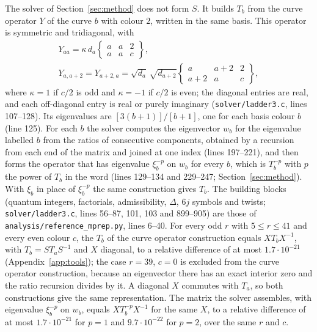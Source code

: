 \documentclass[11pt]{amsart}
\theoremstyle{definition}
\theoremstyle{remark}
\begin{document}
The solver of Section~\ref{sec:method} does not form $S$. It builds $T_b$ from the
curve operator $Y$ of the curve $b$ with colour $2$, written in the same basis. This
operator is symmetric and tridiagonal, with
\begin{gather*}
Y_{aa} = \kappa\, d_a \begin{Bmatrix} a & a & 2 \\ a & a & c \end{Bmatrix},
\\
Y_{a,a+2} = Y_{a+2,a} = \sqrt{d_a}\,\sqrt{d_{a+2}}
\begin{Bmatrix} a & a+2 & 2 \\ a+2 & a & c \end{Bmatrix},
\end{gather*}
where $\kappa = 1$ if $c/2$ is odd and $\kappa = -1$ if $c/2$ is even; the diagonal
entries are real, and each off-diagonal entry is real or purely imaginary
(\texttt{solver/ladder3.c}, lines 107--128). Its eigenvalues are $[3(b+1)]/[b+1]$,
one for each basis colour $b$ (line 125). For each $b$ the solver computes the
eigenvector $w_b$ for the eigenvalue labelled $b$ from the ratios of consecutive
components, obtained by a recursion from each end of the matrix and joined at one
index (lines 197--221), and then forms the operator that has eigenvalue $\xi_b^{-p}$
on $w_b$ for every $b$, which is $T_b^{-p}$ with $p$ the power of $T_b$ in the word
(lines 129--134 and 229--247; Section~\ref{sec:method}). With $\xi_b$ in place of
$\xi_b^{-p}$ the same construction gives $T_b$. The building blocks (quantum integers,
factorials, admissibility, $\Delta$, $6j$ symbols and twists;
\texttt{solver/ladder3.c}, lines 56--87, 101, 103 and 899--905) are those of
\texttt{analysis/reference\_mprep.py}, lines 6--40. For every odd $r$ with
$5 \le r \le 41$ and every even colour $c$, the $T_b$ of the curve operator
construction equals $X T_b X^{-1}$, with $T_b = S T_a S^{-1}$ and $X$ diagonal, to a
relative difference of at most $1.7 \cdot 10^{-21}$ (Appendix~\ref{app:tools}); the
case $r = 39$, $c = 0$ is excluded from the curve operator construction, because an
eigenvector there has an exact interior zero and the ratio recursion divides by it.
A diagonal $X$ commutes with $T_a$, so both constructions give the same
representation. The matrix the solver assembles, with eigenvalue $\xi_b^{-p}$ on $w_b$,
equals $X T_b^{-p} X^{-1}$ for the same $X$, to a relative difference of at most
$1.7 \cdot 10^{-21}$ for $p = 1$ and $9.7 \cdot 10^{-22}$ for $p = 2$, over the same
$r$ and $c$.
\end{document}
